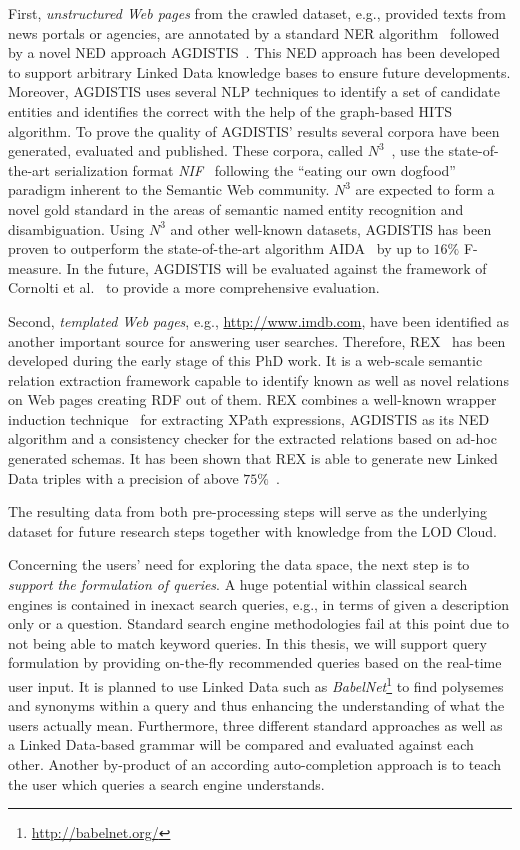 First, \emph{unstructured Web pages} from the crawled dataset, e.g., provided texts from news portals or agencies, are annotated by a standard NER algorithm~\cite{stanford} followed by a novel NED approach AGDISTIS~\cite{AGDISTIS}.
This NED approach has been developed to support arbitrary Linked Data knowledge bases to ensure future developments.
Moreover, AGDISTIS uses several NLP techniques to identify a set of candidate entities and identifies the correct with the help of the graph-based HITS algorithm. %
To prove the quality of AGDISTIS' results several corpora have been generated, evaluated and published. 
These corpora, called $N^3$~\cite{n3}, use the state-of-the-art serialization format \emph{NIF}~\cite{NIF} following the ``eating our own dogfood'' paradigm inherent to the Semantic Web community. 
$N^3$ are expected to form a novel gold standard in the areas of semantic named entity recognition and disambiguation.
Using $N^3$ and other well-known datasets, AGDISTIS has been proven to outperform the state-of-the-art algorithm AIDA~\cite{AIDA} by up to $16\%$ F-measure.
In the future, AGDISTIS will be evaluated against the framework of Cornolti et al.~\cite{cornolti} to provide a more comprehensive evaluation. 

Second, \emph{templated Web pages}, e.g., \url{http://www.imdb.com}, have been identified as another important source for answering user searches.
Therefore, REX~\cite{REX} has been developed during the early stage of this PhD work.
It is a web-scale semantic relation extraction framework capable to identify known as well as novel relations on Web pages creating RDF out of them.
REX combines a well-known wrapper induction technique~\cite{Crescenzi2013} for extracting XPath expressions, AGDISTIS as its NED algorithm and a consistency checker for the extracted relations based on ad-hoc generated schemas.
It has been shown that REX is able to generate new Linked Data triples with a precision of above $75\%$~\cite{REX}.

The resulting data from both pre-processing steps will serve as the underlying dataset for future research steps together with knowledge from the LOD Cloud.

Concerning the users' need for exploring the data space, %
the next step is to \emph{support the formulation of queries}.
A huge potential within classical search engines is contained in inexact search queries, e.g., in terms of given a description only or a question.
Standard search engine methodologies fail at this point due to not being able to match keyword queries. 
In this thesis, we will support query formulation by providing on-the-fly recommended queries based on the real-time user input.
It is planned to use Linked Data such as \emph{BabelNet}\footnote{\url{http://babelnet.org/}} to find polysemes and synonyms within a query and thus enhancing the understanding of what the users actually mean.
Furthermore, three different standard approaches as well as a Linked Data-based grammar will be compared and evaluated against each other.
Another by-product of an according auto-completion approach is to teach the user which queries a search engine understands.

